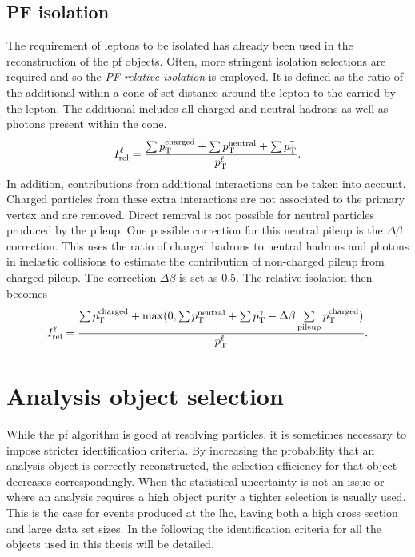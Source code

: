 \subsection{PF isolation} %
\label{sub:pf_isolation}

The requirement of leptons to be isolated has already been used in the reconstruction of the \acrshort{pf} objects.
Often, more stringent isolation selections are required and so the \textit{PF relative isolation} \Irel{} is employed.
It is defined as the ratio of the additional \pt{} within a cone of set distance around the lepton to the \pt{} carried by the lepton.
The additional \pt{} includes all charged and neutral hadrons as well as photons present within the cone.
\begin{equation}
	I_{\mathrm{rel}}^{\ell} = \frac{\sum p_{\mathrm{T}}^{\mathrm{charged}} + \sum p_{\mathrm{T}}^{\mathrm{neutral}} + \sum p_{\mathrm{T}}^{\gamma}}{p_{\mathrm{T}}^{\ell}}.
\end{equation}
In addition, contributions from additional interactions can be taken into account.
Charged particles from these extra interactions are not associated to the primary vertex and are removed.
Direct removal is not possible for neutral particles produced by the pileup.
One possible correction for this neutral pileup is the $\Delta\beta$ correction.
This uses the ratio of charged hadrons to neutral hadrons and photons in inelastic collisions to estimate the contribution of non-charged pileup from charged pileup.
The correction $\Delta\beta$ is set as 0.5.
The relative isolation then becomes
\begin{equation}
	I_{\mathrm{rel}}^{\ell} = \frac{\sum p_{\mathrm{T}}^{\mathrm{charged}} + \max(0, \sum p_{\mathrm{T}}^{\mathrm{neutral}} + \sum p_{\mathrm{T}}^{\gamma} - \Delta\beta\sum\limits^{}_{\mathrm{pileup}}p_{\mathrm{T}}^{\mathrm{charged}})}{p_{\mathrm{T}}^{\ell}}.
\end{equation}

\section{Analysis object selection}
\label{sec:analysis_objects}

While the \acrshort{pf} algorithm is good at resolving particles, it is sometimes necessary to impose stricter identification criteria.
By increasing the probability that an analysis object is correctly reconstructed, the selection efficiency for that object decreases correspondingly.
When the statistical uncertainty is not an issue or where an analysis requires a high object purity a tighter selection is usually used.
This is the case for \ttbar{} events produced at the \acrshort{lhc}, having both a high cross section and large data set sizes.
In the following the identification criteria for all the objects used in this thesis will be detailed.

